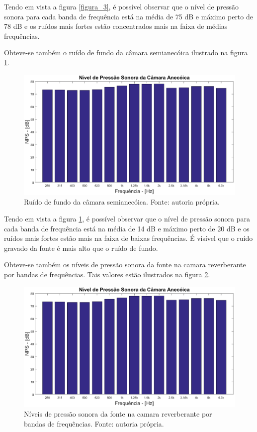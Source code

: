 Tendo em vista a figura \ref{figura_3}, é possível observar que o nível de pressão sonora para cada banda de frequência está na média de 75 dB e máximo perto de 78 dB e os ruídos mais fortes estão concentrados mais na faixa de médias frequências.


\newpage
Obteve-se também o ruído de fundo da câmara semianecóica ilustrado na figura \ref{figura_4}.
\begin{figure}[h!]
    \hspace{-4.5cm}
    \includegraphics[width=1.6\textwidth]{figuras/P_anecoica.eps}
    \caption{Ruído de fundo da câmara semianecóica. Fonte: autoria própria.}
    \label{figura_4}
\end{figure}

Tendo em vista a figura \ref{figura_4}, é possível observar que o nível de pressão sonora para cada banda de frequência está na média de 14 dB e máximo perto de 20 dB e os ruídos mais fortes estão mais na faixa de baixas frequências. É visível que o ruído gravado da fonte é mais alto que o ruído de fundo.

\newpage
Obteve-se também os níveis de pressão sonora da fonte na camara reverberante por bandas de frequências. Tais valores estão ilustrados na figura \ref{figura_5}.
\begin{figure}[h!]
    \hspace{-4.5cm}
    \includegraphics[width=1.6\textwidth]{figuras/P_anecoica.eps}
    \caption{Níveis de pressão sonora da fonte na camara reverberante por bandas de frequências. Fonte: autoria própria.}
    \label{figura_5}
\end{figure}

